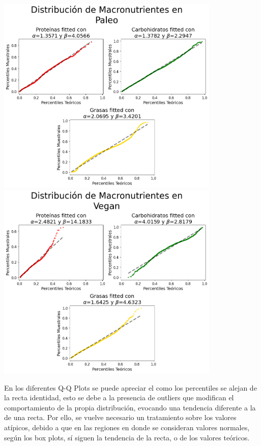 \documentclass[12pt,a4paper]{article}
\begin{document}
\begin{center}
            \includegraphics[width=0.8\textwidth]{Resources/5_05_plot_4.png}
            \includegraphics[width=0.8\textwidth]{Resources/5_05_plot_5.png}
        \end{center}

        En los diferentes Q-Q Plots se puede apreciar el como los percentiles se alejan 
        de la recta identidad, esto se debe a la presencia de outliers que modifican 
        el comportamiento de la propia distribución, evocando una tendencia diferente a 
        la de una recta. Por ello, se vuelve necesario un tratamiento sobre los valores 
        atípicos, debido a que en las regiones en donde se consideran valores normales, 
        según los box plots, sí siguen la tendencia de la recta, o de los valores teóricos.\\
\end{document}
